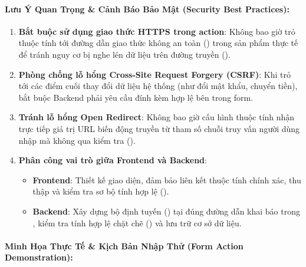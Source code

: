 \paragraph{Lưu Ý Quan Trọng \& Cảnh Báo Bảo Mật (Security Best Practices):}

\begin{warnBox}
\begin{enumerate}[leftmargin=1.5em, itemsep=3pt, parsep=0pt]
    \item \textbf{Bắt buộc sử dụng giao thức HTTPS trong action}: Không bao giờ trỏ thuộc tính  tới đường dẫn giao thức không an toàn () trong sản phẩm thực tế để tránh nguy cơ bị nghe lén dữ liệu trên đường truyền ().
    \item \textbf{Phòng chống lỗ hổng Cross-Site Request Forgery (CSRF)}: Khi  trỏ tới các điểm cuối thay đổi dữ liệu hệ thống (như đổi mật khẩu, chuyển tiền), bắt buộc Backend phải yêu cầu đính kèm  hợp lệ bên trong form.
    \item \textbf{Tránh lỗ hổng Open Redirect}: Không bao giờ cấu hình thuộc tính  nhận trực tiếp giá trị URL biến động truyền từ tham số chuỗi truy vấn người dùng nhập mà không qua kiểm tra ().
    \item \textbf{Phân công vai trò giữa Frontend và Backend}:
    \begin{itemize}[leftmargin=1.2em, itemsep=2pt]
        \item \textbf{Frontend}: Thiết kế giao diện, đảm bảo liên kết thuộc tính  chính xác, thu thập và kiểm tra sơ bộ tính hợp lệ ().
        \item \textbf{Backend}: Xây dựng bộ định tuyến () tại đúng đường dẫn khai báo trong , kiểm tra tính hợp lệ chặt chẽ () và lưu trữ cơ sở dữ liệu.
    \end{itemize}
\end{enumerate}
\end{warnBox}

\paragraph{Minh Họa Thực Tế \& Kịch Bản Nhập Thử (Form Action Demonstration):}

